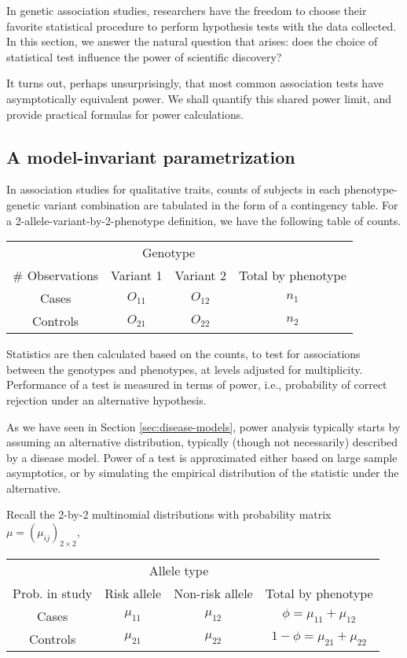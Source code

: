 In genetic association studies, researchers have the freedom to choose their favorite statistical procedure to perform hypothesis tests with the data collected.
In this section, we answer the natural question that arises: does the choice of statistical test influence the power of scientific discovery?

It turns out, perhaps unsurprisingly, that most common association tests have asymptotically equivalent power. 
We shall quantify this shared power limit, and provide practical formulas for power calculations.

\subsection{A model-invariant parametrization}

In association studies for qualitative traits, counts of subjects in each phenotype-genetic variant combination are tabulated in the form of a contingency table.
For a 2-allele-variant-by-2-phenotype definition, we have the following table of counts.

\begin{center}
    \begin{tabular}{cccc}
    \hline
    & \multicolumn{2}{c}{Genotype} & \\
    \cline{2-3}
    \# Observations & Variant 1 & Variant 2 & Total by phenotype \\
    \hline
    Cases & $O_{11}$ & $O_{12}$ & $n_1$ \\
    Controls & $O_{21}$ & $O_{22}$ & $n_2$ \\
    \hline
    \end{tabular}
\end{center}

Statistics are then calculated based on the counts, to test for associations between the genotypes and phenotypes, at levels adjusted for multiplicity.
Performance of a test is measured in terms of power, i.e., probability of correct rejection under an alternative hypothesis.

As we have seen in Section \ref{sec:disease-models}, power analysis typically starts by assuming an alternative distribution, typically (though not necessarily) described by a disease model.
Power of a test is approximated either based on large sample asymptotics, or by simulating the empirical distribution of the statistic under the alternative.

Recall the 2-by-2 multinomial distributions with probability matrix $\mu = (\mu_{ij})_{2\times2}$,
\begin{center}
    \begin{tabular}{cccc}
    \hline
    & \multicolumn{2}{c}{Allele type} \\
    \cline{2-3}
    Prob. in study & Risk allele & Non-risk allele & Total by phenotype \\
    \hline
    Cases & $\mu_{11}$ & $\mu_{12}$ & $\phi = \mu_{11} + \mu_{12}$ \\
    Controls & $\mu_{21}$ & $\mu_{22}$ & $1-\phi = \mu_{21} + \mu_{22}$ \\
    \hline
    \end{tabular}
\end{center}

